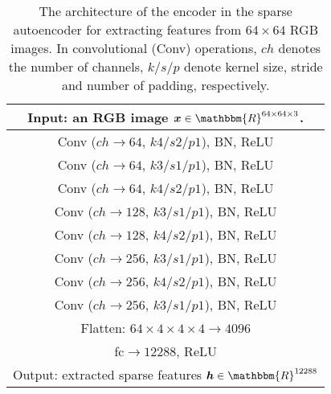 \documentclass[final,12pt, 3p,times]{elsarticle}
\begin{document}
\begin{table}[h]
	\centering
	\caption{The architecture of the encoder in the sparse autoencoder for extracting features from $64\times 64$ RGB images. In convolutional (Conv) operations, $ch$ denotes the number of channels, $k/s/p$ denote kernel size, stride and number of padding, respectively. }
\begin{tabular}{c}
			\toprule
			Input: an RGB image $\bm{x}\in \mathbbm{R}^{64\times64\times3}$. \\ 
			\hline
			Conv ($ch\rightarrow64$, $k4/s2/p1$), BN, ReLU \\\hline
			Conv ($ch\rightarrow64$, $k3/s1/p1$), BN, ReLU \\\hline
			Conv ($ch\rightarrow64$, $k4/s2/p1$), BN, ReLU \\\hline
			Conv ($ch\rightarrow128$, $k3/s1/p1$), BN, ReLU \\\hline
			Conv ($ch\rightarrow128$, $k4/s2/p1$), BN, ReLU \\\hline
			Conv ($ch\rightarrow256$, $k3/s1/p1$), BN, ReLU \\\hline
			Conv ($ch\rightarrow256$, $k4/s2/p1$), BN, ReLU \\\hline
			Conv ($ch\rightarrow256$, $k3/s1/p1$), BN, ReLU \\ \hline
			Flatten: $64\times 4 \times 4\times 4 \rightarrow 4096$ \\ \hline
			fc$\rightarrow 12288$, ReLU \\\hline
			Output: extracted sparse features $\bm{h}\in \mathbbm{R}^{12288}$
			\\ \bottomrule
		\end{tabular}\label{tab:SparseAE_encoder_64x64}\end{table}
\end{document}

